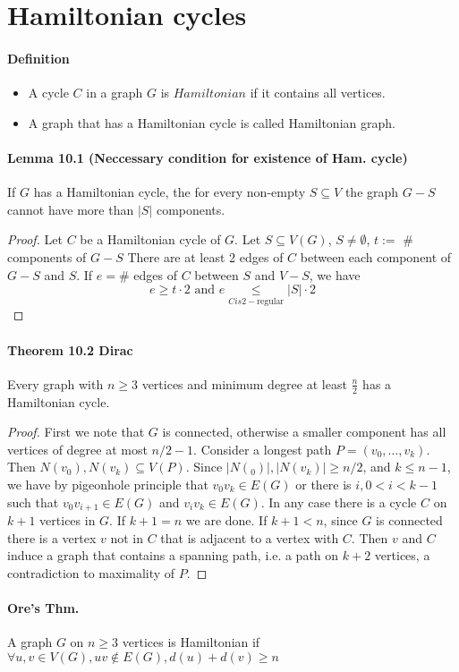 \section{Hamiltonian cycles}
\paragraph{Definition}
\begin{itemize}
    \item A cycle $C$ in a graph $G$ is $Hamiltonian$ 
    if it contains all vertices.

    \item  A graph that has a Hamiltonian cycle is called Hamiltonian graph.
\end{itemize}


\paragraph{Lemma 10.1 (Neccessary condition for existence of Ham. cycle)} $ $\\
If $G$ has a Hamiltonian cycle, the for every non-empty $S \subseteq V$ the 
graph $G - S$ cannot have more than $|S|$ components.
\begin{proof}
    Let $C$ be a Hamiltonian cycle of $G$.
    Let $S \subseteq V(G)$, $S \neq \emptyset$, $t :=$ \# components of $G - S$
    There are at least 2 edges of $ C $ between each component of $ G - S $
    and $ S$. If $ e = \#$ edges of $ C $ between $ S $ and $ V - S$, 
    we have 
    $$ e \geq t \cdot 2 \text{ and } e \underset{C is 2-\text{regular}}{\leq}
    |S| \cdot 2 $$ 
\end{proof}

\paragraph{Theorem 10.2 Dirac} Every graph with $n \geq 3$ vertices and 
minimum degree at least $\frac{n}{2}$ has a Hamiltonian cycle.
\begin{proof}
    First we note that $G$ is connected, otherwise a smaller component has all 
    vertices of degree at most $n/2-1$. Consider a longest path 
    $P = (v_0,...,v_k)$. Then $N(v_0),N(v_k) \subseteq V(P)$. Since 
    $|N(_0)|,|N(v_k)| \geq n/2$, and $k \leq n-1$, we have by pigeonhole
    principle that $v_0v_k \in E(G)$ or there is $i, 0 < i < k-1$ such 
    that $v_0v_{i+1} \in E(G)$ and $v_iv_k \in E(G)$. In any case there is a 
    cycle $C$ on $k+1$ vertices in $G$. If $k+1=n$ we are done. If $k+1<n$, 
    since $G$ is connected there is a vertex $v$ not in $C$ that is adjacent to
    a vertex with $C$. Then $v$ and $C$ induce a graph that contains a spanning
    path, i.e. a path on $k+2$ vertices, a contradiction to maximality of $P$.
\end{proof}

\paragraph{Ore's Thm.}
A graph $ G $ on $ n \geq 3 $ vertices is Hamiltonian if  
$ \forall u,v \in V(G), uv \notin E(G), d(u)+d(v) \geq n $
